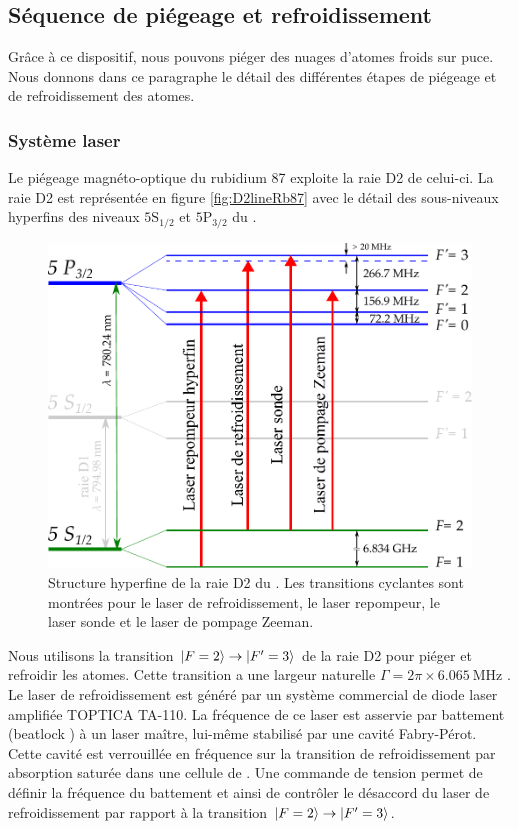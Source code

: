 	\subsection{Séquence de piégeage et refroidissement}
	
\noindent Grâce à ce dispositif, nous pouvons piéger des nuages d'atomes froids sur puce.
Nous donnons dans ce paragraphe le détail des différentes étapes de piégeage et de refroidissement des atomes.

	\subsubsection*{Système laser}
\noindent Le piégeage magnéto-optique du rubidium 87 exploite la raie D2 de celui-ci.
La raie D2 est représentée en figure \eqref{fig:D2lineRb87} avec le détail des sous-niveaux hyperfins des niveaux $\mathrm{5S_{1/2}}$ et $\mathrm{5P_{3/2}}$ du .
%	
\begin{figure}[!h]
\centering
\includegraphics[width=0.8\linewidth]{figures/setup/coldatoms/D2lineRb87}
\caption[Raie D2 du ]{Structure hyperfine de la raie D2 du .
Les transitions cyclantes sont montrées pour le laser de refroidissement, le laser repompeur, le laser sonde et le laser de pompage Zeeman.
}
\label{fig:D2lineRb87}
\end{figure}
%
Nous utilisons la transition $\ket{F=2} \rightarrow \ket{F'=3}$ de la raie D2 pour piéger et refroidir les atomes.
Cette transition a une largeur naturelle $\Gamma = 2\pi \times \SI{6.065}{\MHz}$ \cite{DATA_STECKRB87}.
Le laser de refroidissement est généré par un système commercial de diode laser amplifiée TOPTICA TA-110.
La fréquence de ce laser est asservie par battement (\og beatlock \fg{}) à un laser maître, lui-même stabilisé par une cavité Fabry-Pérot.
Cette cavité est verrouillée en fréquence sur la transition de refroidissement par absorption saturée dans une cellule de .
Une commande de tension permet de définir la fréquence du battement et ainsi de contrôler le désaccord du laser de refroidissement par rapport à la transition $\ket{F=2}\rightarrow\ket{F'=3}$.

